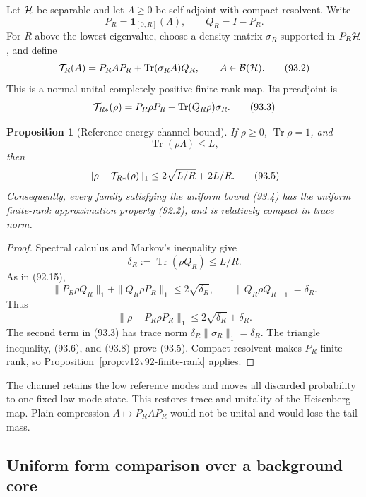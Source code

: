 \documentclass[11pt]{article}
\newtheorem{proposition}[theorem]{Proposition}
\theoremstyle{remark}
\begin{document}
Let \({\cal H}\) be separable and let
\(\Lambda\geq0\) be self-adjoint with compact resolvent.  Write
\[
 P_R=\mathbf 1_{[0,R]}(\Lambda),\qquad Q_R=I-P_R.                 \tag{93.1}
\]
For \(R\) above the lowest eigenvalue, choose a density matrix
\(\sigma_R\) supported in \(P_R{\cal H}\), and define
\[
 {\cal T}_R(A)
 =P_RAP_R+\operatorname{Tr}(\sigma_RA)Q_R,
 \qquad A\in{\cal B}({\cal H}).                                  \tag{93.2}
\]
This is a normal unital completely positive finite-rank map.  Its
preadjoint is
\[
 {\cal T}_{R*}(\rho)
 =P_R\rho P_R+\operatorname{Tr}(Q_R\rho)\sigma_R.                 \tag{93.3}
\]

\begin{proposition}[Reference-energy channel bound]
\label{prop:v12v93-channel}
If \(\rho\geq0\), \(\operatorname{Tr}\rho=1\), and
\[
 \operatorname{Tr}(\rho\Lambda)\leq L,                            \tag{93.4}
\]
then
\[
 \|\rho-{\cal T}_{R*}(\rho)\|_1
 \leq2\sqrt{L/R}+2L/R.                                           \tag{93.5}
\]
Consequently, every family satisfying the uniform bound (93.4) has
the uniform finite-rank approximation property (92.2), and is
relatively compact in trace norm.
\end{proposition}

\begin{proof}
Spectral calculus and Markov's inequality give
\[
 \delta_R:=\operatorname{Tr}(\rho Q_R)\leq L/R.                  \tag{93.6}
\]
As in (92.15),
\[
 \|P_R\rho Q_R\|_1+\|Q_R\rho P_R\|_1
 \leq2\sqrt{\delta_R},
 \qquad
 \|Q_R\rho Q_R\|_1=\delta_R.                                    \tag{93.7}
\]
Thus
\[
 \|\rho-P_R\rho P_R\|_1
 \leq2\sqrt{\delta_R}+\delta_R.                                  \tag{93.8}
\]
The second term in (93.3) has trace norm
\(\delta_R\|\sigma_R\|_1=\delta_R\).  The triangle inequality,
(93.6), and (93.8) prove (93.5).  Compact resolvent makes \(P_R\)
finite rank, so Proposition~\ref{prop:v12v92-finite-rank} applies.
\end{proof}

The channel retains the low reference modes and moves all discarded
probability to one fixed low-mode state.  This restores trace and
unitality of the Heisenberg map.  Plain compression \(A\mapsto
P_RAP_R\) would not be unital and would lose the tail mass.

\subsection{Uniform form comparison over a background core}
\end{document}
